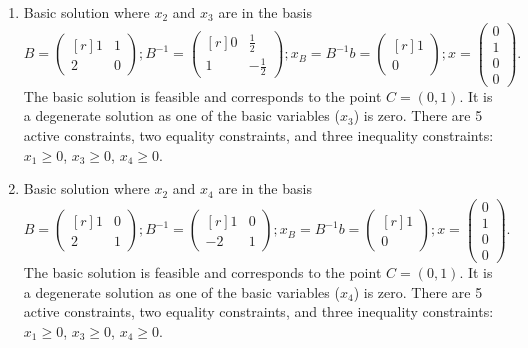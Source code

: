 \begin{enumerate}
\item Basic solution where $x_2$ and $x_3$ are in the basis
$$
B =
\begin{pmatrix*}[r]
1&1\\
2&0
\end{pmatrix*}
;
B^{-1} =
\begin{pmatrix*}[r]
0&\frac{1}{2}\\
1 & -\frac{1}{2}
\end{pmatrix*}
;
x_B=B^{-1}b=
\begin{pmatrix*}[r]
1\\
0
\end{pmatrix*}
;
x
=
\begin{pmatrix}
0\\
1\\
0\\
0
\end{pmatrix}.
$$
The basic solution is feasible and corresponds to the point $C=(0,1)$.  It
is a degenerate solution as one of the basic variables ($x_3$) is zero. There
are 5 active constraints, two equality constraints, and three
inequality constraints: $x_1 \geq 0$, $x_3 \geq 0$, $x_4 \geq 0$.

\item Basic solution where $x_2$ and $x_4$ are in the basis
$$
B =
\begin{pmatrix*}[r]
1&0\\
2&1
\end{pmatrix*}
;
B^{-1} =
\begin{pmatrix*}[r]
1&0\\
-2 & 1
\end{pmatrix*}
;
x_B=B^{-1}b=
\begin{pmatrix*}[r]
1\\
0
\end{pmatrix*}
;
x
=
\begin{pmatrix}
0\\
1\\
0\\
0
\end{pmatrix}.
$$
The basic solution is feasible and corresponds to the point $C=(0,1)$. It
is a degenerate solution as one of the basic variables ($x_4$) is zero.  There
are 5 active constraints, two equality constraints, and three
inequality constraints: $x_1 \geq 0$, $x_3 \geq 0$, $x_4 \geq 0$.


\end{enumerate}
